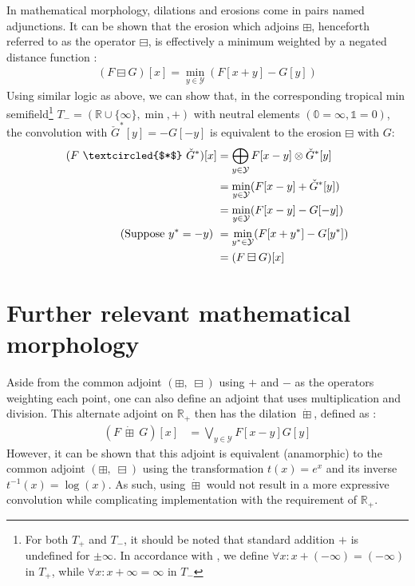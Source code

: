\documentclass[a4paper, 12pt]{report}
\begin{document}
In mathematical morphology, dilations and erosions come in pairs named adjunctions. It can be shown that the erosion which adjoins $\boxplus$, henceforth referred to as the operator $\boxminus$, is effectively a minimum weighted by a negated distance function \cite{heijmans1996morphological}: 
\begin{align}
	(F \boxminus G)[x]=\min_{y\in \mathcal{Y}}(F[x+y] - G[y])
\end{align}
\noindent
Using similar logic as above, we can show that, in the corresponding tropical min semifield\footnote{For both $T_+$ and $T_-$, it should be noted that standard addition $+$ is undefined for $\pm\infty$. In accordance with \cite{maragos}, we define $\forall x: x+(-\infty)=(-\infty)$ in $T_+$, while $\forall x: x+\infty=\infty$ in $T_-$} $T_-=(\mathbb{R}\cup\{\infty\},\min,+)$ \cite{maragos} with neutral elements $(\mathbb{0}=\infty, \mathbb{1}=0)$, the convolution with $\check{G}^*[y]=-G[-y]$ is equivalent to the erosion $\boxminus$ with $G$:
\begin{align}
	(F ~\textcircled{$*$}~ \check{G}^*)[x]
	&= \bigoplus_{y\in \mathcal{Y}}F[x-y] \otimes \check{G}^*[y] \\
	&= \min_{y\in \mathcal{Y}}(F[x-y] + \check{G}^*[y]) \\
	&= \min_{y\in \mathcal{Y}}(F[x-y] - G[-y]) \\
	\textrm{(Suppose $y^*=-y)$  }&= \min_{y^*\in \mathcal{Y}}(F[x+y^*] - G[y^*]) \\
	&= (F \boxminus G)[x]
\end{align}

\section{Further relevant mathematical morphology}
\label{sec:closing}
Aside from the common adjoint $(\boxplus,\; \boxminus)$ using $+$ and $-$ as the operators weighting each point, one can also define an adjoint that uses multiplication and division. This alternate adjoint on $\mathbb{R}_+$ then has the dilation $\dot \boxplus$, defined as \cite{heijmans1996morphological}:
\begin{align}
	(F~ \dot\boxplus~ G)[x] &= \bigvee_{y\in \mathcal{Y}}F[x-y]G[y]
\end{align}
However, it can be shown that this adjoint is equivalent (anamorphic) to the common adjoint $(\boxplus,\; \boxminus)$ using the transformation $t(x)=e^x$ and its inverse $t^{-1}(x)=\log(x)$. As such, using $\dot \boxplus$ would not result in a more expressive convolution while complicating implementation with the requirement of $\mathbb{R}_+$.
\end{document}
